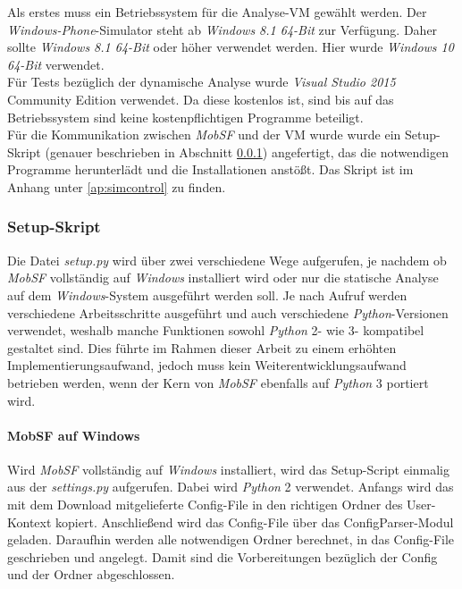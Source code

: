 Als erstes muss ein Betriebssystem für die Analyse-VM gewählt werden. Der \textit{Windows-Phone}-Simulator steht ab \textit{Windows 8.1 64-Bit} zur Verfügung. Daher sollte \textit{Windows 8.1 64-Bit} oder höher verwendet werden. Hier wurde \textit{Windows 10 64-Bit} verwendet.\\

Für Tests bezüglich der dynamische Analyse wurde \textit{Visual Studio 2015} Community Edition verwendet. Da diese kostenlos ist, sind bis auf das Betriebssystem sind keine kostenpflichtigen Programme beteiligt.\\

Für die Kommunikation zwischen \textit{MobSF} und der VM wurde wurde ein Setup-Skript (genauer beschrieben in Abschnitt \ref{ref:WeitMobSFWindSetup}) angefertigt, das die notwendigen Programme herunterlädt und die Installationen anstößt. Das Skript ist im Anhang unter \ref{ap:simcontrol} zu finden.

\subsubsection{Setup-Skript}\label{ref:WeitMobSFWindSetup}
Die Datei \textit{setup.py} wird über zwei verschiedene Wege aufgerufen, je nachdem ob \textit{MobSF} vollständig auf \textit{Windows} installiert wird oder nur die statische Analyse auf dem \textit{Windows}-System ausgeführt werden soll. Je nach Aufruf werden verschiedene Arbeitsschritte ausgeführt und auch verschiedene \textit{Python}-Versionen verwendet, weshalb manche Funktionen sowohl \textit{Python} 2- wie 3- kompatibel gestaltet sind. Dies führte im Rahmen dieser Arbeit zu einem erhöhten Implementierungsaufwand, jedoch muss kein Weiterentwicklungsaufwand betrieben werden, wenn der Kern von \textit{MobSF} ebenfalls auf \textit{Python} 3 portiert wird.

\paragraph{MobSF auf Windows}
Wird \textit{MobSF} vollständig auf \textit{Windows} installiert, wird das Setup-Script einmalig aus der \textit{settings.py} aufgerufen. Dabei wird \textit{Python} 2 verwendet. Anfangs wird das mit dem Download mitgelieferte Config-File in den richtigen Ordner des User-Kontext kopiert. Anschließend wird das Config-File über das ConfigParser-Modul geladen. Daraufhin werden alle notwendigen Ordner berechnet, in das Config-File geschrieben und angelegt. Damit sind die Vorbereitungen bezüglich der Config und der Ordner abgeschlossen.\\

